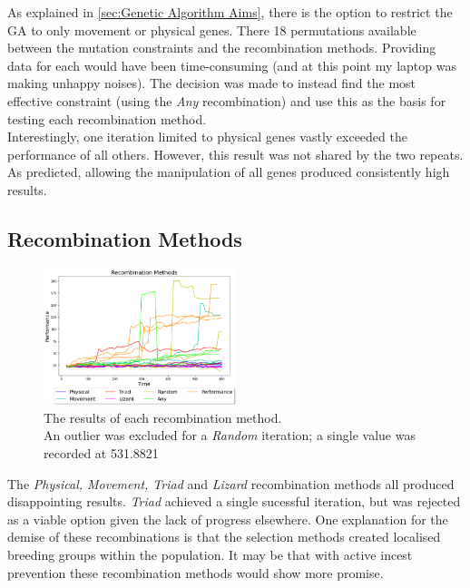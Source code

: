 \documentclass{article}
\begin{document}
As explained in \ref{sec:Genetic Algorithm Aims}, there is the option to restrict the GA to only movement or physical genes. There 18 permutations available between the mutation constraints and the recombination methods. Providing data for each would have been time-consuming (and at this point my laptop was making unhappy noises). The decision was made to instead find the most effective constraint (using the \textit{Any} recombination) and use this as the basis for testing each recombination method.\\
Interestingly, one iteration limited to physical genes vastly exceeded the performance of all others. However, this result was not shared by the two repeats. As predicted, allowing the manipulation of all genes produced consistently high results.

\subsection{Recombination Methods}
\label{sec:Recombination Res}
\begin{figure}
    \centering
    \vspace*{-5mm}
    \includegraphics[width=0.5\textwidth]{recombinationTypes}
    \vspace*{-7mm}
    \caption{The results of each recombination method.\\ An outlier was excluded for a \textit{Random} iteration; a single value was recorded at 531.8821}
    \label{fig:recombinationRes}
\end{figure}
The \textit{Physical, Movement, Triad} and \textit{Lizard} recombination methods all produced disappointing results. \textit{Triad} achieved a single sucessful iteration, but was rejected as a viable option given the lack of progress elsewhere. One explanation for the demise of these recombinations is that the selection methods created localised breeding groups within the population. It may be that with active incest prevention  these recombination methods would show more promise.\\
\end{document}
